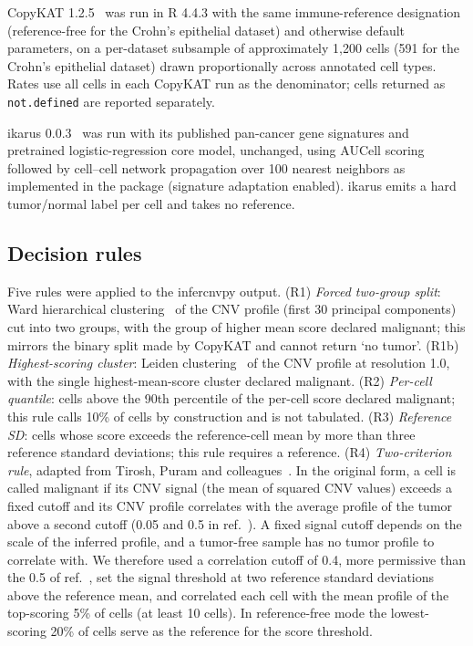 \documentclass[11pt,letterpaper]{article}
\begin{document}
CopyKAT 1.2.5~\cite{copykat} was run in R 4.4.3 with the same immune-reference designation (reference-free for the Crohn's epithelial dataset) and otherwise default parameters, on a per-dataset subsample of approximately 1{,}200 cells (591 for the Crohn's epithelial dataset) drawn proportionally across annotated cell types. Rates use all cells in each CopyKAT run as the denominator; cells returned as \texttt{not.defined} are reported separately.

ikarus 0.0.3~\cite{ikarus} was run with its published pan-cancer gene signatures and pretrained logistic-regression core model, unchanged, using AUCell scoring~\cite{aucell} followed by cell--cell network propagation over 100 nearest neighbors as implemented in the package (signature adaptation enabled). ikarus emits a hard tumor/normal label per cell and takes no reference.

\subsection{Decision rules}

Five rules were applied to the infercnvpy output. (R1) \emph{Forced two-group split}: Ward hierarchical clustering~\cite{ward1963} of the CNV profile (first 30 principal components) cut into two groups, with the group of higher mean score declared malignant; this mirrors the binary split made by CopyKAT and cannot return `no tumor'. (R1b) \emph{Highest-scoring cluster}: Leiden clustering~\cite{leiden} of the CNV profile at resolution 1.0, with the single highest-mean-score cluster declared malignant. (R2) \emph{Per-cell quantile}: cells above the 90th percentile of the per-cell score declared malignant; this rule calls 10\% of cells by construction and is not tabulated. (R3) \emph{Reference SD}: cells whose score exceeds the reference-cell mean by more than three reference standard deviations; this rule requires a reference. (R4) \emph{Two-criterion rule}, adapted from Tirosh, Puram and colleagues~\cite{tirosh2016,tirosh2016b,puram2017}. In the original form, a cell is called malignant if its CNV signal (the mean of squared CNV values) exceeds a fixed cutoff and its CNV profile correlates with the average profile of the tumor above a second cutoff (0.05 and 0.5 in ref.~\cite{puram2017}). A fixed signal cutoff depends on the scale of the inferred profile, and a tumor-free sample has no tumor profile to correlate with. We therefore used a correlation cutoff of 0.4, more permissive than the 0.5 of ref.~\cite{puram2017}, set the signal threshold at two reference standard deviations above the reference mean, and correlated each cell with the mean profile of the top-scoring 5\% of cells (at least 10 cells). In reference-free mode the lowest-scoring 20\% of cells serve as the reference for the score threshold.
\end{document}
